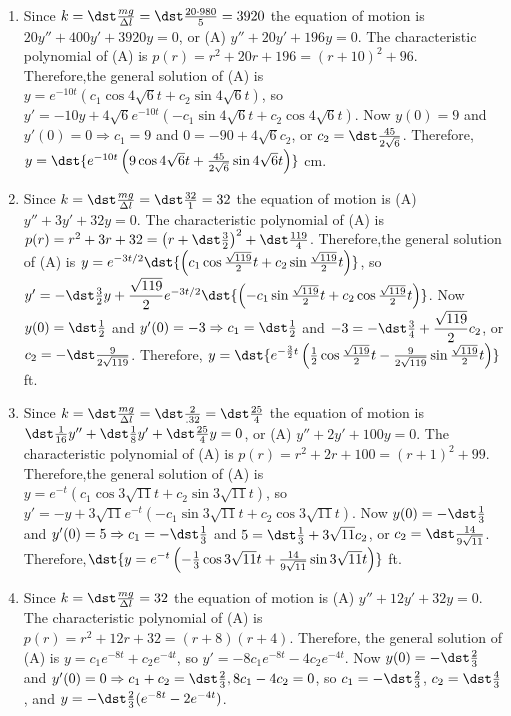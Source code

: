 \documentclass[openany]{book}
\newenvironment{sectionSolutions}{
 \begin{enumerate}[item-label={\thesection.\arabic{enumi}.}]
}{
 \end{enumerate}
}
\begin{document}
\begin{sectionSolutions}
\item
Since $k=\dst\frac{mg}{\Delta l}=\dst\frac{20\cdot980}{5}=3920$ the
equation of motion is $20y''+400y'+3920y=0$, or (A) $y''+20y'+196y=0$.
The characteristic polynomial of (A) is
$p(r)=r^2+20r+196=(r+10)^2+96$. Therefore,the general solution of (A)
is $y=e^{-10t}(c_1\cos4\sqrt6t+c_2\sin4\sqrt6t)$, so
$y'=-10y+4\sqrt6e^{-10t}(-c_1\sin4\sqrt6t+c_2\cos4\sqrt6t)$. Now
$y(0)=9$ and $y'(0)=0\Rightarrow c_1=9$ and $0=-90+4\sqrt6c_2$, or
$c_2=\dst\frac{45}{2\sqrt6}$. Therefore,
$y=\dst{e^{-10t}\left(9\cos4\sqrt{6}t+\frac{45}{2\sqrt{6}}\sin4\sqrt{6}
t\right)}$ cm.


\item
Since $k=\dst\frac{mg}{\Delta l}=\dst\frac{32}{1}=32$ the equation of
motion is (A) $y''+3y'+32y=0$. The characteristic polynomial of (A) is
$p(r)=r^2+3r+32=\left(r+\dst\frac{3}{2}\right)^2+\dst\frac{119}{4}$.
Therefore,the general solution of (A) is
$y=e^{-3t/2}\dst{\left(c_1\cos\frac{\sqrt{119}}{2}t
+c_2\sin\frac{\sqrt{119}}{2}t\right)}$, so $y'=-\dst\frac{3}{2}y+
\dfrac{\sqrt{119}}{2}e^{-3t/2}
\dst{\left(-c_1\sin\frac{\sqrt{119}}{2}t+c_2\cos\frac{\sqrt{119}}{2}t\right)}$.
Now $y(0)=\dst\frac{1}{2}$ and $y'(0)=-3\Rightarrow c_1=\dst\frac{1}{2}$
and $-3=-\dst\frac{3}{4}+\dfrac{\sqrt{119}}{2}c_2$, or
$c_2=-\dst\frac{9}{2\sqrt{119}}$. Therefore,
$y=\dst{e^{-\frac{3}{2}t}\left(\frac{1}{2}\cos\frac{\sqrt{119}}{2} t
-\frac{9}{2\sqrt{119}}\sin\frac{\sqrt{119}}{2}t\right)}$ ft.


\item
Since $k=\dst\frac{mg}{\Delta l}=\dst\frac{2}{.32}=\dst\frac{25}{4}$ the
equation of motion is
$\dst\frac{1}{16}y''+\dst\frac{1}{8}y'+\dst\frac{25}{4}y=0$, or (A)
$y''+2y'+100y=0$. The characteristic polynomial of (A) is
$p(r)=r^2+2r+100=(r+1)^2+99$. Therefore,the general solution of (A) is
$y=e^{-t}(c_1\cos3\sqrt{11}t+c_2\sin3\sqrt{11}t)$, so
$y'=-y+3\sqrt{11}e^{-t}(-c_1\sin3\sqrt{11}t+c_2\cos3\sqrt{11}t)$. Now
$y(0)=-\dst\frac{1}{3}$ and $y'(0)=5\Rightarrow c_1=-\dst\frac{1}{3}$ and
$5=\dst\frac{1}{3}+3\sqrt{11}c_2$, or $c_2=\dst\frac{14}{9\sqrt{11}}$.
Therefore,$\dst{y=e^{-t}\left(-\frac{1}{3}\cos3\sqrt{11} t+
\frac{14}{9\sqrt{11}}\sin3\sqrt{11}t\right)}$ ft.



\item
Since $k=\dst\frac{mg}{\Delta l}=32$ the
equation of motion is
(A) $y''+12y'+32y=0$.
The characteristic polynomial of (A) is
$p(r)=r^2+12r+32=(r+8)(r+4)$. Therefore,
the general solution of (A) is $y=c_1e^{-8t}+c_2e^{-4t}$, so
$y'=-8c_1e^{-8t}-4c_2e^{-4t}$. Now $y(0)=-\dst\frac{2}{3}$ and
$y'(0)=0\Rightarrow c_1+c_2=\dst\frac{2}{3},\-8c_1-4c_2=0$, so
$c_1=-\dst\frac{2}{3}$,  $c_2=\dst\frac{4}{3}$, and
$y=-\dst\frac{2}{3}(e^{-8t}-2e^{-4t})$.



\end{sectionSolutions}
\end{document}
